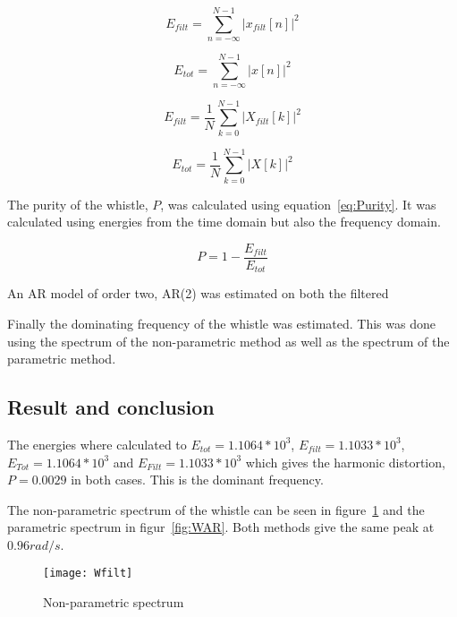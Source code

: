 \documentclass[10pt]{article}
\begin{document}
\begin{equation}
  \label{eq:Etimefilt}
  E_{filt} =\sum\limits_{n=-\infty}^{N-1} |x_{filt}[n]|^2
\end{equation}

\begin{equation}
  \label{eq:Etime}
  E_{tot} =\sum\limits_{n=-\infty}^{N-1} |x[n]|^2
\end{equation}

\begin{equation}
  \label{eq:Efeqfilt}
  E_{filt} =\frac{1}{N}\sum\limits_{k=0}^{N-1} |X_{filt}[k]|^2
\end{equation}

\begin{equation}
  \label{eq:Efeq}
  E_{tot} =\frac{1}{N}\sum\limits_{k=0}^{N-1} |X[k]|^2
\end{equation}

The purity of the whistle, $P$, was calculated using equation~\ref{eq:Purity}.
It was calculated using energies from the time domain but also the
frequency domain.

\begin{equation}
  \label{eq:Purity}
  P =1-\frac{E_{filt}}{E_{tot}}
\end{equation}

An AR model of order two, AR(2) was estimated on both the filtered

Finally the dominating frequency of the whistle was estimated.
This was done using the spectrum of the non-parametric method
as well as the spectrum of the parametric method.

\subsection{Result and conclusion}
The energies where calculated to $E_{tot}=1.1064*10^3$, $E_{filt}=1.1033*10^3$,
$E_{Tot}=1.1064*10^3$ and $E_{Filt}=1.1033*10^3$ which gives the harmonic distortion,
$P= 0.0029$ in both cases. This is the dominant frequency.

The non-parametric spectrum of the whistle can be seen in figure~\ref{fig:Wfilt}
and the parametric spectrum in figur~\ref{fig:WAR}. Both methods give the same peak
at $0.96 rad/s$.


\begin{figure}[!hp]

    \begin{center}
      \texttt{[image: Wfilt]}
    \caption{Non-parametric spectrum \label{fig:Wfilt}}
    \end{center}

\end{figure}
\end{document}
